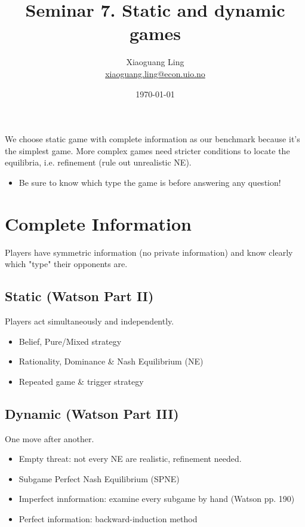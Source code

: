 \documentclass{article}
\title{Seminar 7. Static and dynamic games}
\author{Xiaoguang Ling \\  \href{xiaoguang.ling@econ.uio.no}{xiaoguang.ling@econ.uio.no}}
\date{\today}
\begin{document}
\maketitle

\begin{mdframed}[backgroundcolor=blue!20,linecolor=white]

We choose static game with complete information as our benchmark 
because it's the simplest game. More complex games need stricter conditions to locate the equilibria, i.e. refinement (rule out unrealistic NE). 
\begin{itemize}
\item Be sure to know which type the game is before answering
any question!
\end{itemize}

\section*{Complete Information}

Players have symmetric information (no private information) and
know clearly which "type" their opponents are.


\subsection*{\hspace{4mm} Static (Watson Part II)}
\hspace{4mm} Players act simultaneously and independently.
\begin{itemize}
\item Belief, Pure/Mixed strategy
\item Rationality, Dominance \& Nash Equilibrium (NE)
\item Repeated game \& trigger strategy
\end{itemize}

\subsection*{\hspace{4mm} Dynamic (Watson Part III)}
\hspace{4mm} One move after another.
\begin{itemize}	
\item Empty threat: not every NE are realistic, refinement needed.
\item Subgame Perfect Nash Equilibrium (SPNE)
\item Imperfect innformation: examine every subgame by hand (Watson pp. 190)
\item Perfect information: backward-induction method
\end{itemize}


\end{mdframed}
\end{document}
